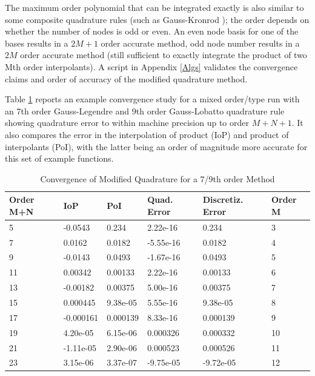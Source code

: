 \documentclass[letterpaper,12pt]{report}
\begin{document}
The maximum order polynomial that can be integrated exactly is also similar to some composite quadrature rules (such as Gauss-Kronrod \cite{Roni}); the order depends on whether the number of nodes is odd or even. An even node basis for one of the bases results in a $2M+1$ order accurate method, odd node number results in a $2M$ order accurate method (still sufficient to exactly integrate the product of two Mth order interpolants). A script in Appendix \ref{Algs} validates the convergence claims and order of accuracy of the modified quadrature method.

Table \ref{table:QuadMod} reports an example convergence study for a mixed order/type run with an 7th order Gauss-Legendre and 9th order Gauss-Lobatto quadrature rule showing quadrature error to within machine precision up to order $M+N+1$. It also compares the error in the interpolation of product (IoP) and product of interpolants (PoI), with the latter being an order of magnitude more accurate for this set of example functions.

\begin{table}
\centering
\caption{Convergence of Modified Quadrature for a 7/9th order Method}\label{table:QuadMod}
\begin{tabular}{llllll}
\hline
Order M+N & IoP       & PoI      & Quad. Error & Discretiz. Error &  Order M  \\ \hline
5         & -0.0543   & 0.234    & 2.22e-16         & 0.234                & 3  \\
7         & 0.0162    & 0.0182   & -5.55e-16        & 0.0182               & 4  \\
9         & -0.0143   & 0.0493   & -1.67e-16        & 0.0493               & 5  \\
11        & 0.00342   & 0.00133  & 2.22e-16         & 0.00133              & 6  \\
13        & -0.00182  & 0.00375  & 5.00e-16         & 0.00375              & 7  \\
15        & 0.000445  & 9.38e-05 & 5.55e-16         & 9.38e-05             & 8  \\
17        & -0.000161 & 0.000139 & 8.33e-16         & 0.000139             & 9  \\
19        & 4.20e-05  & 6.15e-06 & 0.000326         & 0.000332             & 10 \\
21        & -1.11e-05 & 2.90e-06 & 0.000523         & 0.000526             & 11 \\
23        & 3.15e-06  & 3.37e-07 & -9.75e-05        & -9.72e-05            & 12 \\ \hline
\end{tabular}
\end{table}
\end{document}
